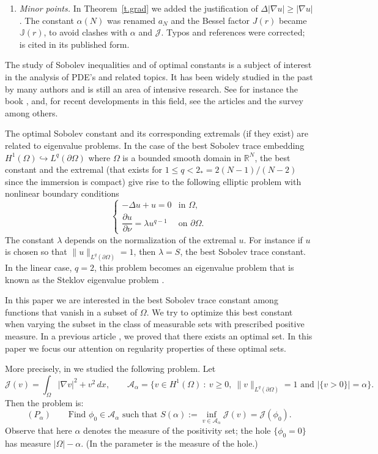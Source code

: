 \documentclass[11pt]{amsart}
\theoremstyle{definition}
\theoremstyle{remark}
\numberwithin{equation}{section}
\newcommand{\R}{\mathbb{R}}
\newcommand{\cA}{\mathcal{A}}
\newcommand{\cJ}{\mathcal{J}}
\begin{document}
\begin{enumerate}
\item \emph{Minor points.} In Theorem~\ref{t.grad} we added the justification of $\Delta|\nabla u|\ge|\nabla u|$. The constant $\alpha(N)$ was renamed $a_N$ and the Bessel factor $J(r)$ became $\mathbb{J}(r)$, to avoid clashes with $\alpha$ and $\cJ$. Typos and references were corrected; \cite{FBRW1} is cited in its published form.
\end{enumerate}

\medskip

The study of Sobolev inequalities and of optimal constants is a subject of interest in the analysis of PDE's and related topics. It has been widely studied in the past by many authors and is still an area of intensive research. See for instance the book \cite{Ad}, and, for recent developments in this field, see the articles \cite{Au,dPF,FBR,LZ} and the survey \cite{DH} among others.

The optimal Sobolev constant and its corresponding extremals (if they exist) are related to eigenvalue problems. In the case of the best Sobolev trace embedding $H^1(\Omega)\hookrightarrow L^q(\partial\Omega)$ where $\Omega$ is a bounded smooth domain in $\R^N$, the best constant and the extremal (that exists for $1\le q<2_*=2(N-1)/(N-2)$ since the immersion is compact) give rise to the following elliptic problem with nonlinear boundary conditions
\[
\begin{cases}
-\Delta u+u=0 & \text{in }\Omega,\\[2pt]
\dfrac{\partial u}{\partial\nu}=\lambda u^{q-1} & \text{on }\partial\Omega.
\end{cases}
\]
The constant $\lambda$ depends on the normalization of the extremal $u$. For instance if $u$ is chosen so that $\|u\|_{L^q(\partial\Omega)}=1$, then $\lambda=S$, the best Sobolev trace constant. In the linear case, $q=2$, this problem becomes an eigenvalue problem that is known as the Steklov eigenvalue problem \cite{St}.

In this paper we are interested in the best Sobolev trace constant among functions that vanish in a subset of $\Omega$. We try to optimize this best constant when varying the subset in the class of measurable sets with prescribed positive measure. In a previous article \cite{FBRW1}, we proved that there exists an optimal set. In this paper we focus our attention on regularity properties of these optimal sets.

More precisely, in \cite{FBRW1} we studied the following problem. Let
\[
\cJ(v)=\int_\Omega|\nabla v|^2+v^2\,dx,\qquad
\cA_\alpha=\{v\in H^1(\Omega)\ :\ v\ge0,\ \|v\|_{L^q(\partial\Omega)}=1\text{ and }|\{v>0\}|=\alpha\}.
\]
Then the problem is:
\[
(P_\alpha)\qquad\text{Find }\phi_0\in\cA_\alpha\text{ such that } S(\alpha):=\inf_{v\in\cA_\alpha}\cJ(v)=\cJ(\phi_0).
\]
Observe that here $\alpha$ denotes the measure of the positivity set; the hole $\{\phi_0=0\}$ has measure $|\Omega|-\alpha$. (In \cite{FBRW1} the parameter is the measure of the hole.)
\end{document}
